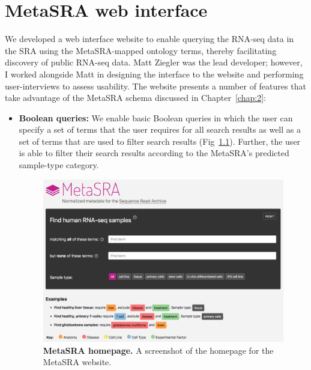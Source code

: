 \chapter{MetaSRA web interface } \label{app:website}

We developed a web interface website to enable querying the RNA-seq data in the SRA using the MetaSRA-mapped ontology terms, thereby facilitating discovery of public RNA-seq data. Matt Ziegler was the lead developer; however, I worked alongside Matt in designing the interface to the website and performing user-interviews to assess usability.   The website presents a number of features that take advantage of the MetaSRA schema discussed in Chapter~\ref{chap:2}:

\begin{itemize}
\item \textbf{Boolean queries:} We enable basic Boolean queries in which the user can specify a set of terms that the user requires for all search results as well as a set of terms that are used to filter search results (Fig~\ref{fig:webpage}).  Further, the user is able to filter their search results according to the MetaSRA's predicted sample-type category.
\begin{figure}[htbp]
\centering
\includegraphics[width=12cm]{figures/web_page.png}  
\caption{\textbf{MetaSRA homepage.} A screenshot of the homepage for the MetaSRA website.}
\label{fig:webpage}
\end{figure}


\end{itemize}
